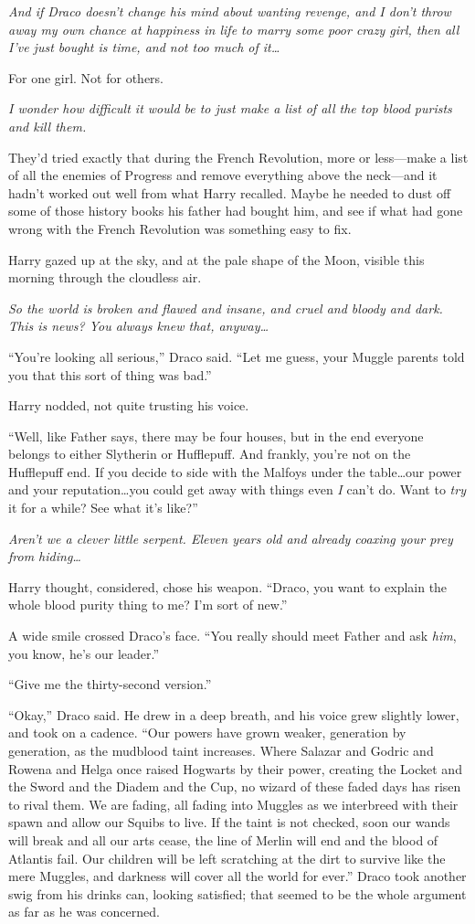 \emph{And if Draco doesn’t change his mind about wanting revenge, and I don’t throw away my own chance at happiness in life to marry some poor crazy girl, then all I’ve just bought is time, and not too much of it…}

For one girl. Not for others.

\emph{I wonder how difficult it would be to just make a list of all the top blood purists and kill them.}

They’d tried exactly that during the French Revolution, more or less—make a list of all the enemies of Progress and remove everything above the neck—and it hadn’t worked out well from what Harry recalled. Maybe he needed to dust off some of those history books his father had bought him, and see if what had gone wrong with the French Revolution was something easy to fix.

Harry gazed up at the sky, and at the pale shape of the Moon, visible this morning through the cloudless air.

\emph{So the world is broken and flawed and insane, and cruel and bloody and dark. This is news? You always knew that, anyway…}

“You’re looking all serious,” Draco said. “Let me guess, your Muggle parents told you that this sort of thing was bad.”

Harry nodded, not quite trusting his voice.

“Well, like Father says, there may be four houses, but in the end everyone belongs to either Slytherin or Hufflepuff. And frankly, you’re not on the Hufflepuff end. If you decide to side with the Malfoys under the table…our power and your reputation…you could get away with things even \emph{I} can’t do. Want to \emph{try} it for a while? See what it’s like?”

\emph{Aren’t we a clever little serpent. Eleven years old and already coaxing your prey from hiding…}

Harry thought, considered, chose his weapon. “Draco, you want to explain the whole blood purity thing to me? I’m sort of new.”

A wide smile crossed Draco’s face. “You really should meet Father and ask \emph{him}, you know, he’s our leader.”

“Give me the thirty-second version.”

“Okay,” Draco said. He drew in a deep breath, and his voice grew slightly lower, and took on a cadence. “Our powers have grown weaker, generation by generation, as the mudblood taint increases. Where Salazar and Godric and Rowena and Helga once raised Hogwarts by their power, creating the Locket and the Sword and the Diadem and the Cup, no wizard of these faded days has risen to rival them. We are fading, all fading into Muggles as we interbreed with their spawn and allow our Squibs to live. If the taint is not checked, soon our wands will break and all our arts cease, the line of Merlin will end and the blood of Atlantis fail. Our children will be left scratching at the dirt to survive like the mere Muggles, and darkness will cover all the world for ever.” Draco took another swig from his drinks can, looking satisfied; that seemed to be the whole argument as far as he was concerned.

